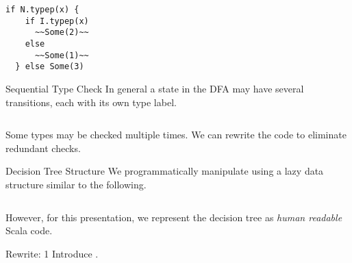 \newsavebox\typecaseKhbox
\begin{lrbox}{\typecaseKhbox}
  \begin{minipage}{8cm}
\begin{lstlisting}[style=scalaioScala]
  if N.typep(x) {
    if I.typep(x)
      ~~Some(2)~~
    else
      ~~Some(1)~~
  } else Some(3)
\end{lstlisting}
  \end{minipage}
\end{lrbox}



\begin{frame}{Sequential Type Check}
  In general a state in the DFA may have several transitions, each with its own type label.
  \begin{columns}
    \begin{column}{0.5\textwidth}
      \usebox\typecaseAbox
    \end{column}
    \begin{column}{0.5\textwidth}  %
      \scalebox{0.9}{}
    \end{column}    
  \end{columns}

  Some types may be checked multiple times.  We can rewrite the code to eliminate redundant checks.
\end{frame}

\begin{frame}{Decision Tree Structure}
  We programmatically manipulate  using a lazy data structure similar to the following.

  \begin{columns}
    \begin{column}{0.5\textwidth}
      \usebox\typecaseAbox
    \end{column}
    \begin{column}{0.5\textwidth}  %
      \usebox\typecaseITEbox
    \end{column}    
  \end{columns}

  However, for this presentation, we represent the decision tree as \emph{human readable} Scala code.
\end{frame}



\begin{frame}{Rewrite: 1}
  Introduce .

  \begin{columns}
    \begin{column}{0.5\textwidth}
      \usebox\typecaseAbox
    \end{column}
    \begin{column}{0.5\textwidth}  %
      \usebox\typecaseBabox
    \end{column}    
  \end{columns}
\end{frame}

